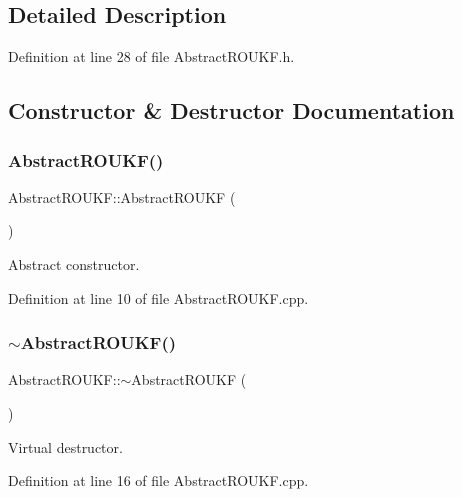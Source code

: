 \subsection{Detailed Description}


Definition at line 28 of file Abstract\+R\+O\+U\+K\+F.\+h.



\subsection{Constructor \& Destructor Documentation}
\mbox{\label{classAbstractROUKF_afbeabf5f80a3cd9dcbd9c551cde20cfe}} 
\subsubsection{\texorpdfstring{Abstract\+R\+O\+U\+K\+F()}{AbstractROUKF()}}
{\footnotesize\ttfamily Abstract\+R\+O\+U\+K\+F\+::\+Abstract\+R\+O\+U\+KF (\begin{DoxyParamCaption}{ }\end{DoxyParamCaption})}

Abstract constructor. 

Definition at line 10 of file Abstract\+R\+O\+U\+K\+F.\+cpp.

\mbox{\label{classAbstractROUKF_a6b02fbadd6db005bb85fc364fbe5d7f9}} 
\subsubsection{\texorpdfstring{$\sim$\+Abstract\+R\+O\+U\+K\+F()}{~AbstractROUKF()}}
{\footnotesize\ttfamily Abstract\+R\+O\+U\+K\+F\+::$\sim$\+Abstract\+R\+O\+U\+KF (\begin{DoxyParamCaption}{ }\end{DoxyParamCaption})\hspace{0.3cm}{\ttfamily [virtual]}}

Virtual destructor. 

Definition at line 16 of file Abstract\+R\+O\+U\+K\+F.\+cpp.



